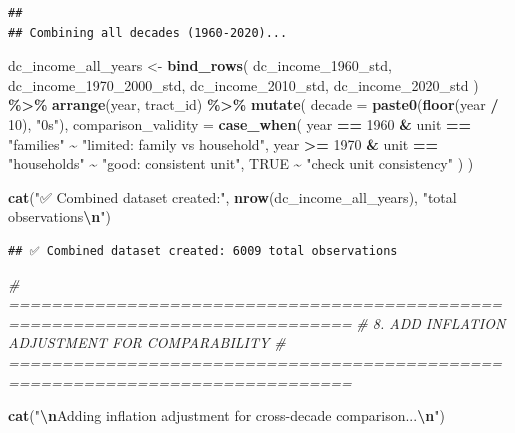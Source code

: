 \documentclass[
]{article}
\newenvironment{Shaded}{\begin{snugshade}}{\end{snugshade}}
\newcommand{\AttributeTok}[1]{\textcolor[rgb]{0.13,0.29,0.53}{#1}}
\newcommand{\CommentTok}[1]{\textcolor[rgb]{0.56,0.35,0.01}{\textit{#1}}}
\newcommand{\ConstantTok}[1]{\textcolor[rgb]{0.56,0.35,0.01}{#1}}
\newcommand{\DecValTok}[1]{\textcolor[rgb]{0.00,0.00,0.81}{#1}}
\newcommand{\FunctionTok}[1]{\textcolor[rgb]{0.13,0.29,0.53}{\textbf{#1}}}
\newcommand{\NormalTok}[1]{#1}
\newcommand{\OtherTok}[1]{\textcolor[rgb]{0.56,0.35,0.01}{#1}}
\newcommand{\SpecialCharTok}[1]{\textcolor[rgb]{0.81,0.36,0.00}{\textbf{#1}}}
\newcommand{\StringTok}[1]{\textcolor[rgb]{0.31,0.60,0.02}{#1}}
\begin{document}
\begin{verbatim}
## 
## Combining all decades (1960-2020)...
\end{verbatim}

\begin{Shaded}
\begin{Highlighting}[]
\NormalTok{dc\_income\_all\_years }\OtherTok{\textless{}{-}} \FunctionTok{bind\_rows}\NormalTok{(}
\NormalTok{  dc\_income\_1960\_std,}
\NormalTok{  dc\_income\_1970\_2000\_std,}
\NormalTok{  dc\_income\_2010\_std,}
\NormalTok{  dc\_income\_2020\_std}
\NormalTok{) }\SpecialCharTok{\%\textgreater{}\%}
  \FunctionTok{arrange}\NormalTok{(year, tract\_id) }\SpecialCharTok{\%\textgreater{}\%}
  \FunctionTok{mutate}\NormalTok{(}
    \AttributeTok{decade =} \FunctionTok{paste0}\NormalTok{(}\FunctionTok{floor}\NormalTok{(year }\SpecialCharTok{/} \DecValTok{10}\NormalTok{), }\StringTok{"0s"}\NormalTok{),}
    \AttributeTok{comparison\_validity =} \FunctionTok{case\_when}\NormalTok{(}
\NormalTok{      year }\SpecialCharTok{==} \DecValTok{1960} \SpecialCharTok{\&}\NormalTok{ unit }\SpecialCharTok{==} \StringTok{"families"} \SpecialCharTok{\textasciitilde{}} \StringTok{"limited: family vs household"}\NormalTok{,}
\NormalTok{      year }\SpecialCharTok{\textgreater{}=} \DecValTok{1970} \SpecialCharTok{\&}\NormalTok{ unit }\SpecialCharTok{==} \StringTok{"households"} \SpecialCharTok{\textasciitilde{}} \StringTok{"good: consistent unit"}\NormalTok{,}
      \ConstantTok{TRUE} \SpecialCharTok{\textasciitilde{}} \StringTok{"check unit consistency"}
\NormalTok{    )}
\NormalTok{  )}

\FunctionTok{cat}\NormalTok{(}\StringTok{"✅ Combined dataset created:"}\NormalTok{, }\FunctionTok{nrow}\NormalTok{(dc\_income\_all\_years), }\StringTok{"total observations}\SpecialCharTok{\textbackslash{}n}\StringTok{"}\NormalTok{)}
\end{Highlighting}
\end{Shaded}

\begin{verbatim}
## ✅ Combined dataset created: 6009 total observations
\end{verbatim}

\begin{Shaded}
\begin{Highlighting}[]
\CommentTok{\# ==============================================================================}
\CommentTok{\# 8. ADD INFLATION ADJUSTMENT FOR COMPARABILITY}
\CommentTok{\# ==============================================================================}

\FunctionTok{cat}\NormalTok{(}\StringTok{"}\SpecialCharTok{\textbackslash{}n}\StringTok{Adding inflation adjustment for cross{-}decade comparison...}\SpecialCharTok{\textbackslash{}n}\StringTok{"}\NormalTok{)}
\end{Highlighting}
\end{Shaded}
\end{document}

